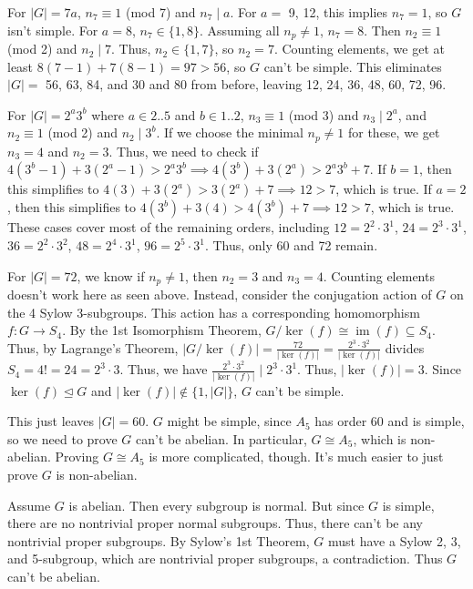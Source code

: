 \documentclass[fleqn]{article}
\DeclareMathOperator{\im}{im}
\begin{document}
        For $|G| = 7a$, $n_7 \equiv 1$ (mod 7) and $n_7 \mid a$.  For $a =$ 9, 12, this implies $n_7 = 1$, so $G$ isn't simple.  For $a = 8$, $n_7 \in \{1, 8\}$.  Assuming all $n_p \neq 1$, $n_7 = 8$.  Then $n_2 \equiv 1$ (mod 2) and $n_2 \mid 7$.  Thus, $n_2 \in \{1, 7\}$, so $n_2 = 7$.  Counting elements, we get at least $8(7 - 1) + 7(8 - 1) = 97 > 56$, so $G$ can't be simple.  This eliminates $|G| =$ 56, 63, 84, and 30 and 80 from before, leaving 12, 24, 36, 48, 60, 72, 96.
        
        For $|G| = 2^a 3^b$ where $a \in 2..5$ and $b \in 1..2$, $n_3 \equiv 1$ (mod 3) and $n_3 \mid 2^a$, and $n_2 \equiv 1$ (mod 2) and $n_2 \mid 3^b$.  If we choose the minimal $n_p \neq 1$ for these, we get $n_3 = 4$ and $n_2 = 3$.  Thus, we need to check if $4(3^b - 1) + 3(2^a - 1) > 2^a 3^b \implies 4(3^b) + 3(2^a) > 2^a 3^b + 7$.  If $b = 1$, then this simplifies to $4(3) + 3(2^a) > 3(2^a) + 7 \implies 12 > 7$, which is true.  If $a = 2$, then this simplifies to $4(3^b) + 3(4) > 4(3^b) + 7 \implies 12 > 7$, which is true.  These cases cover most of the remaining orders, including $12 = 2^2 \cdot 3^1$, $24 = 2^3 \cdot 3^1$, $36 = 2^2 \cdot 3^2$, $48 = 2^4 \cdot 3^1$, $96 = 2^5 \cdot 3^1$.  Thus, only 60 and 72 remain.
        
        For $|G| = 72$, we know if $n_p \neq 1$, then $n_2 = 3$ and $n_3 = 4$.  Counting elements doesn't work here as seen above.  Instead, consider the conjugation action of $G$ on the 4 Sylow 3-subgroups.  This action has a corresponding homomorphism $f: G \to S_4$.  By the 1st Isomorphism Theorem, $G/\ker(f) \cong \im(f) \subseteq S_4$.  Thus, by Lagrange's Theorem, $|G/\ker(f)| = \frac{72}{|\ker(f)|} = \frac{2^3 \cdot 3^2}{|\ker(f)|}$ divides $S_4 = 4! = 24 = 2^3 \cdot 3$.  Thus, we have $\frac{2^3 \cdot 3^2}{|\ker(f)|} \mid 2^3 \cdot 3^1$.  Thus, $|\ker(f)| = 3$.  Since $\ker(f) \unlhd G$ and $|\ker(f)| \notin \{1, |G|\}$, $G$ can't be simple.
        
        \pagebreak
        
        This just leaves $|G| = 60$.  $G$ might be simple, since $A_5$ has order 60 and is simple, so we need to prove $G$ can't be abelian.  In particular, $G \cong A_5$, which is non-abelian.  Proving $G \cong A_5$ is more complicated, though.  It's much easier to just prove $G$ is non-abelian.  
        
        Assume $G$ is abelian.  Then every subgroup is normal.  But since $G$ is simple, there are no nontrivial proper normal subgroups.  Thus, there can't be any nontrivial proper subgroups.  By Sylow's 1st Theorem, $G$ must have a Sylow 2, 3, and 5-subgroup, which are nontrivial proper subgroups, a contradiction.  Thus $G$ can't be abelian.
        
\end{document}
